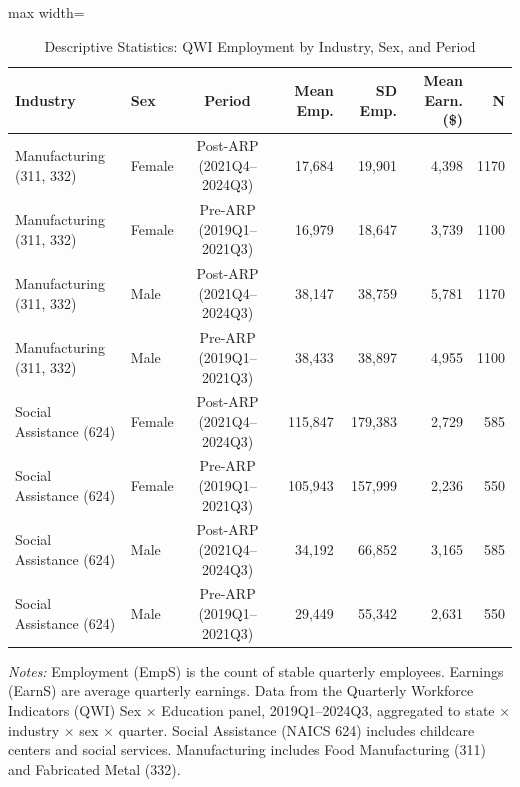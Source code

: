 \begin{table}[htbp]
\centering
\caption{Descriptive Statistics: QWI Employment by Industry, Sex, and Period}
\label{tab:desc}
\begin{adjustbox}{max width=\textwidth}
\begin{tabular}{llcrrrr}
\toprule
Industry & Sex & Period & Mean Emp. & SD Emp. & Mean Earn. (\$) & N \\
\midrule
Manufacturing (311, 332) & Female & Post-ARP (2021Q4--2024Q3) & 17,684 & 19,901 & 4,398 & 1170 \\
Manufacturing (311, 332) & Female & Pre-ARP (2019Q1--2021Q3) & 16,979 & 18,647 & 3,739 & 1100 \\
Manufacturing (311, 332) & Male & Post-ARP (2021Q4--2024Q3) & 38,147 & 38,759 & 5,781 & 1170 \\
Manufacturing (311, 332) & Male & Pre-ARP (2019Q1--2021Q3) & 38,433 & 38,897 & 4,955 & 1100 \\
\midrule
Social Assistance (624) & Female & Post-ARP (2021Q4--2024Q3) & 115,847 & 179,383 & 2,729 & 585 \\
Social Assistance (624) & Female & Pre-ARP (2019Q1--2021Q3) & 105,943 & 157,999 & 2,236 & 550 \\
Social Assistance (624) & Male & Post-ARP (2021Q4--2024Q3) & 34,192 & 66,852 & 3,165 & 585 \\
Social Assistance (624) & Male & Pre-ARP (2019Q1--2021Q3) & 29,449 & 55,342 & 2,631 & 550 \\
\midrule
\bottomrule
\end{tabular}
\end{adjustbox}
\begin{tablenotes}[flushleft]
\small
\item \textit{Notes:} Employment (EmpS) is the count of stable quarterly employees. Earnings (EarnS) are average quarterly earnings. Data from the Quarterly Workforce Indicators (QWI) Sex $\times$ Education panel, 2019Q1--2024Q3, aggregated to state $\times$ industry $\times$ sex $\times$ quarter. Social Assistance (NAICS 624) includes childcare centers and social services. Manufacturing includes Food Manufacturing (311) and Fabricated Metal (332).
\end{tablenotes}
\end{table}
